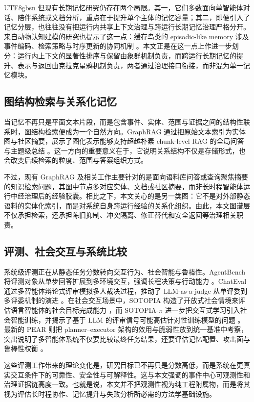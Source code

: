 \documentclass[a4paper,fleqn]{cas-sc}
\begin{document}
\begin{CJK*}{UTF8}{gbsn}
但现有长期记忆研究仍存在两个局限。其一，它们多数面向单智能体对话、陪伴系统或文档分析，重点在于提升单个主体的记忆容量；其二，即便引入了记忆分层，也往往没有把运行内共享上下文治理与跨运行长期记忆治理严格分开。来自动物认知建模的研究也提示了这一点：缓存鸟类的 episodic-like memory 涉及事件编码、检索策略与时序更新的协同机制 \citep{brea2023episodic}。本文正是在这一点上作进一步划分：运行内上下文的显著性排序与保留由象群机制负责，而跨运行长期记忆的提升、表示与返回由克拉克星鸦机制负责，两者通过治理接口衔接，而非混为单一记忆模块。

\subsection{图结构检索与关系化记忆}

当记忆不再只是平面文本片段，而是包含事件、实体、范围与证据之间的结构性联系时，图结构检索便成为一个自然方向。GraphRAG 通过把原始文本索引为实体图与社区摘要，展示了图化表示能够支持超越朴素 chunk-level RAG 的全局问答与主题级总结 \citep{edge2024graphrag}。这一方向的重要意义在于，它说明关系结构不仅是存储形式，也会改变后续检索的粒度、范围与答案组织方式。

不过，现有 GraphRAG 及相关工作主要针对的是面向语料库问答或查询聚焦摘要的知识检索问题，其图中节点多对应实体、文档或社区摘要，而非长时程智能体运行中经治理后的经验胶囊。相比之下，本文关心的是另一类图：它不是对外部静态语料的实体化索引，而是对系统自身跨运行经验的关系化组织。由此，本文图谱层不仅承担检索，还承担陈旧抑制、冲突隔离、修正替代和安全返回等治理相关职责。

\subsection{评测、社会交互与系统比较}

系统级评测正在从静态任务分数转向交互行为、社会智能与鲁棒性。AgentBench 将评测对象从单步回答扩展到多环境交互，强调长程决策与行动能力 \citep{liu2024agentbench}。ChatEval 通过多智能体辩论式评审模拟多人裁决过程，推动了 LLM-as-a-judge 从单评委到多评委机制的演进 \citep{chan2024chateval}。在社会交互场景中，SOTOPIA 构造了开放式社会情境来评估语言智能体的社会目标完成能力 \citep{zhou2024sotopia}，而 SOTOPIA-$\pi$ 进一步把交互式学习引入社会智能训练，并揭示了基于 LLM 的评审信号可能高估针对性训练模型的问题 \citep{wang2024sotopiapi}。最新的 PEAR 则把 planner--executor 架构的效用与脆弱性放到统一基准中考察，突出说明了多智能体系统不仅要比较最终任务结果，还要评估记忆配置、攻击面与鲁棒性权衡 \citep{dong2026pear}。

这些评测工作带来的理论变化是，研究目标已不再只是分数高低，而是系统在更真实交互条件下的可靠性、安全性与可解释性。这与本文强调的事件中心可观测性和治理证据链高度一致。也就是说，本文并不把观测性视为纯工程附属物，而是将其视为评估长时程协作、记忆提升与失败分析所必需的方法学基础设施。


\end{CJK*}
\end{document}
